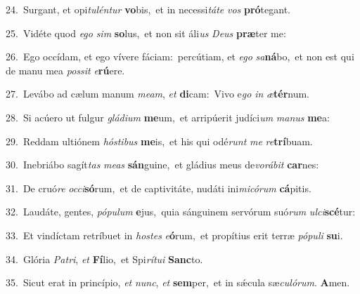 {\numbfont\textcolor{\numbcolor}{24.}}~Surgant, et opi\-\textit{tu}\-\textit{lén}\textit{tur} \textbf{vo}\-bis,~\star et in necessi\-\textit{tá}\-\textit{te} \textit{vos} \textbf{pró}\-tegant.\par
{\numbfont\textcolor{\numbcolor}{25.}}~Vidéte quod \textit{e}\-\textit{go} \textit{sim} \textbf{so}\-lus,~\star et non sit áli\textit{us} \textit{De}\-\textit{us} \textbf{præ}\-ter me:\par
{\numbfont\textcolor{\numbcolor}{26.}}~Ego occídam, et ego vívere fáciam:~\dagger percútiam, et \textit{e}\-\textit{go} \textit{sa}\-\textbf{ná}bo,~\star et non est qui de manu mea \textit{pos}\-\textit{sit} \textit{e}\-\textbf{rú}ere.\par
{\numbfont\textcolor{\numbcolor}{27.}}~Levábo ad cælum manum \textit{me}\-\textit{am}, \textit{et} \textbf{di}\-cam:~\star Vivo e\textit{go} \textit{in} \textit{æ}\-\textbf{tér}num.\par
{\numbfont\textcolor{\numbcolor}{28.}}~Si acúero ut fulgur \textit{glá}\-\textit{di}\textit{um} \textbf{me}\-um,~\star et arripúerit judíci\textit{um} \textit{ma}\-\textit{nus} \textbf{me}\-a:\par
{\numbfont\textcolor{\numbcolor}{29.}}~Reddam ultiónem \textit{hós}\-\textit{ti}\textit{bus} \textbf{me}\-is,~\star et his qui odé\textit{runt} \textit{me} \textit{re}\-\textbf{trí}buam.\par
{\numbfont\textcolor{\numbcolor}{30.}}~Inebriábo sagít\textit{tas} \textit{me}\-\textit{as} \textbf{sán}\-guine,~\star et gládius meus de\-\textit{vo}\-\textit{rá}\textit{bit} \textbf{car}\-nes:\par
{\numbfont\textcolor{\numbcolor}{31.}}~De cruó\textit{re} \textit{oc}\-\textit{ci}\textbf{só}rum,~\star et de captivitáte, nudáti ini\-\textit{mi}\-\textit{có}\textit{rum} \textbf{cá}\-pitis.\par
{\numbfont\textcolor{\numbcolor}{32.}}~Laudáte, gentes, \textit{pó}\-\textit{pu}\textit{lum} \textbf{e}\-jus,~\star quia sánguinem servórum suó\textit{rum} \textit{ul}\-\textit{ci}\textbf{scé}tur:\par
{\numbfont\textcolor{\numbcolor}{33.}}~Et vindíctam retríbuet in \textit{hos}\-\textit{tes} \textit{e}\-\textbf{ó}rum,~\star et propítius erit terræ \textit{pó}\-\textit{pu}\textit{li} \textbf{su}\-i.\par
{\numbfont\textcolor{\numbcolor}{34.}}~Glória \textit{Pa}\-\textit{tri}, \textit{et} \textbf{Fí}\-lio,~\star et Spi\-\textit{rí}\-\textit{tu}\textit{i} \textbf{Sanc}\-to.\par
{\numbfont\textcolor{\numbcolor}{35.}}~Sicut erat in princípio, \textit{et} \textit{nunc}\-, \textit{et} \textbf{sem}\-per,~\star et in sǽcula sæ\-\textit{cu}\-\textit{ló}\textit{rum}. \textbf{A}\-men.\par
